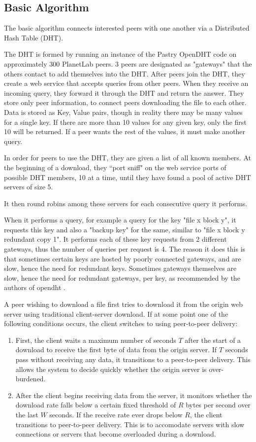\subsection{Basic Algorithm}

The basic algorithm connects interested peers with one another via a Distributed Hash Table (DHT).

The DHT is formed by running an instance of the Pastry OpenDHT code on approximately 300 PlanetLab peers.  3 peers are designated as "gateways" that the others
contact to add themselves into the DHT.  After peers join the DHT, they create a web service that accepts queries from other peers.  When they receive an
incoming query, they forward it through the DHT and return the answer. They store only peer information, to connect peers downloading the file to each other.
Data is stored as Key, Value pairs, though in reality there may be many values for a single key.  If there are more than 10 values for any given
key, only the first 10 will be returned. If a peer wants the rest of the values, it must make another query.

In order for peers to use the DHT, they are given a list of all known members.  At the beginning of a download, they ``port sniff" on the web service ports of
possible DHT members, 10 at a time, until they have found a pool of active DHT servers  of size 5.

It then round robins among these servers for each consecutive query it performs.

When it performs a query, for example a query for the key "file x block y", it requests this key and also a "backup key" for the same, similar to "file x block y redundant copy 1".  It performs
each of these key requests from 2 different gateways, thus the number of queries per request is 4.  The reason it does this is that sometimes certain keys are hosted by poorly connected gateways,
and are slow, hence the need for redundant keys.  Sometimes gateways themselves are slow, hence the need for redundant gateways, per key, as recommended by the authors of opendht \cite{opendht_speed}.


A peer wishing to download a file first tries to download it from the origin web server using traditional client-server download.  If at some point one of the following conditions occurs, the client switches to using 
peer-to-peer delivery:
\begin{enumerate}
\item First, the client waits a maximum number of seconds $T$ after the start of a download to receive the first byte of data from the origin server.  
If $T$ seconds pass without receiving any data, it transitions to a peer-to-peer delivery.  This allows the system to decide quickly whether the origin server is over-burdened.   
\item After the client begins receiving data from the server, it monitors whether the download rate falls below a certain fixed 
threshold of $R$ bytes per second over the last $W$ seconds.  If the receive rate ever drops below $R$, the client transitions to peer-to-peer delivery.  
This is to accomodate servers with slow connections or servers that become overloaded during a download.
\end{enumerate}

